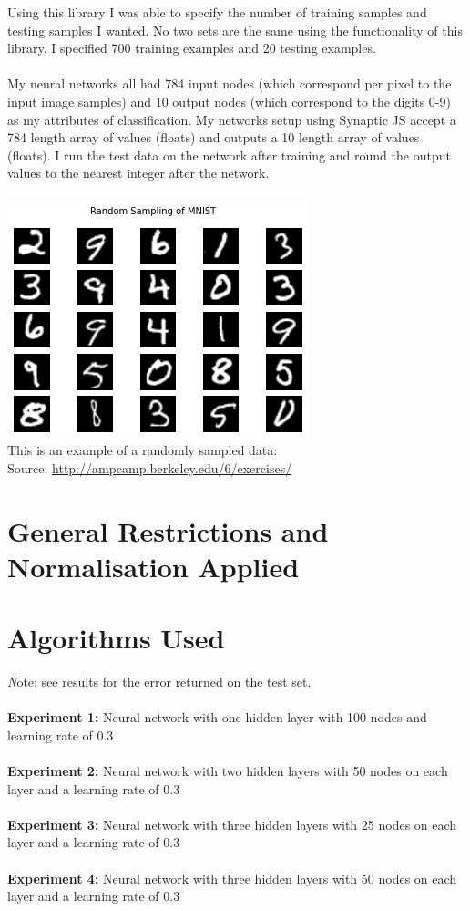 \documentclass[11pt]{article}
\begin{document}
\begin{page}
Using this library I was able to specify the number of training samples and testing samples I wanted. No two sets are the same using the functionality of this library. I specified 700 training examples and 20 testing examples. \\\\

My neural networks all had 784 input nodes (which correspond per pixel to the input image samples) and 10 output nodes (which correspond to the digits 0-9) as my attributes of classification. My networks setup using Synaptic JS accept a 784 length array of values (floats) and outputs a 10 length array of values (floats). I run the test data on the network after training and round the output values to the nearest integer after the network. \\\\

\includegraphics{2}\\
This is an example of a randomly sampled data:\\
Source: \url{http://ampcamp.berkeley.edu/6/exercises/} 

\section{General Restrictions and Normalisation Applied}


\section{Algorithms Used}
\emph Note: see results for the error returned on the test set.\\\\
\textbf{Experiment 1:} Neural network with one hidden layer with 100 nodes and learning rate of 0.3\\\\
\textbf{Experiment 2:} Neural network with two hidden layers with 50 nodes on each layer and a learning rate of 0.3\\\\
\textbf{Experiment 3:} Neural network with three hidden layers with 25 nodes on each layer and a learning rate of 0.3\\\\
\textbf{Experiment 4:} Neural network with three hidden layers with 50 nodes on each layer and a learning rate of 0.3\\\\




\end{page}
\end{document}

